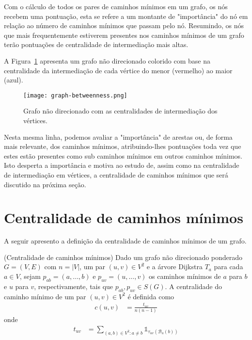 Com o cálculo de todos os pares de caminhos mínimos em um grafo, os nós recebem uma pontuação, esta se refere a um montante de "importância" do nó em relação ao número de caminhos mínimos que passam pelo nó. Resumindo, os nós que mais frequentemente estiverem presentes nos caminhos mínimos de um grafo terão pontuações de centralidade de intermediação mais altas.

A Figura~\ref{sec3:graph-betweenness} apresenta um grafo não direcionado colorido com base na centralidade da intermediação de cada vértice do menor (vermelho) ao maior (azul).

\begin{figure}[!htb]
    \centering
    \texttt{[image: graph-betweenness.png]}
    \caption{Grafo não direcionado com as centralidades de intermediação dos vértices.}
    \label{sec3:graph-betweenness}
\end{figure}

Nesta mesma linha, podemos avaliar a "importância" de arestas ou, de forma mais relevante, dos caminhos mínimos, atribuindo-lhes pontuações toda vez que estes estão presentes como sub caminhos mínimos em outros caminhos mínimos. Isto desperta a importância e motiva ao estudo de, assim como na centralidade de intermediação em vértices, a centralidade de caminhos mínimos que será discutido na próxima seção.

\section{Centralidade de caminhos mínimos}
A seguir apresento a definição da centralidade de caminhos mínimos de um grafo.

\begin{definition}
    (Centralidade de caminhos mínimos) Dado um grafo não direcionado ponderado $G = (V, E)$ com $n = |V|$, um par $(u, v) \in V^2$ e a árvore Dijkstra $T_a$ para cada $a \in V$, sejam $p_{ab} = (a,...,b)$ e $p_{uv} = (u,...,v)$ os caminhos mínimos de $a$ para $b$ e $u$ para $v$, respectivamente, tais que $p_{ab}, p_{uv} \in S(G)$. A centralidade do caminho mínimo de um par $(u, v) \in V^2$ é definida como
    \begin{align*}
        c(u, v) &= \frac{t_{uv}}{n(n - 1)}
    \end{align*}
    onde
    \begin{align*}
        t_{uv} &= \sum_{(a,b) \in V^2 : a \neq b} \mathbb{1}_{\tau_{uv}(\mathcal{B}_a(b))}
    \end{align*}
\end{definition}

